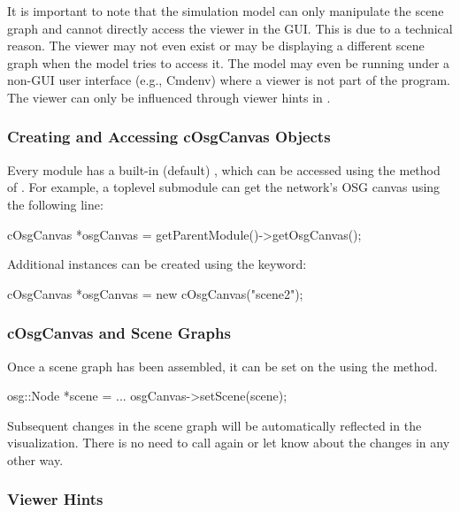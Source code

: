 It is important to note that the simulation model can only manipulate the scene
graph and cannot directly access the viewer in the GUI. This is due to a
technical reason. The viewer may not even exist or may be displaying a different
scene graph when the model tries to access it. The model may even be running
under a non-GUI user interface (e.g., Cmdenv) where a viewer is not part of the
program. The viewer can only be influenced through viewer hints in
.


\subsubsection{Creating and Accessing cOsgCanvas Objects}
\label{sec:graphics:creating-and-accessing-osgcanvas-objects}

Every module has a built-in (default) , which can be accessed
using the  method of . For example, a
toplevel submodule can get the network's OSG canvas using the following line:

\begin{cpp}
cOsgCanvas *osgCanvas = getParentModule()->getOsgCanvas();
\end{cpp}

Additional  instances can be created using the  keyword:

\begin{cpp}
cOsgCanvas *osgCanvas = new cOsgCanvas("scene2");
\end{cpp}

\subsubsection{cOsgCanvas and Scene Graphs}
\label{sec:graphics:osgcanvas-and-scene-graphs}

Once a scene graph has been assembled, it can be set on the 
using the  method.

\begin{cpp}
osg::Node *scene = ...
osgCanvas->setScene(scene);
\end{cpp}

Subsequent changes in the scene graph will be automatically reflected in the
visualization. There is no need to call  again or let {\opp}
know about the changes in any other way.

\subsubsection{Viewer Hints}
\label{sec:graphics:osgcanvas-viewer-hints}


